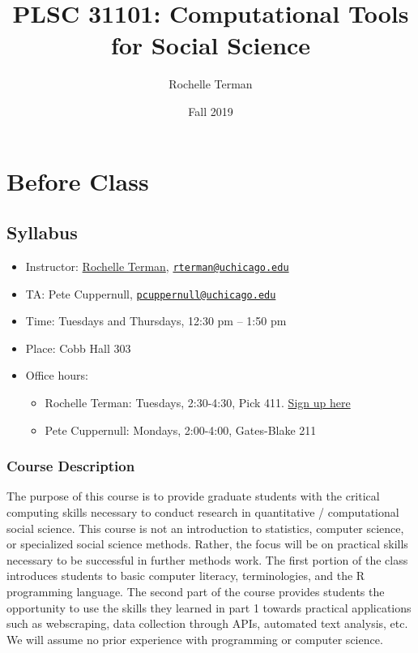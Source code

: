 \documentclass[]{book}
\title{PLSC 31101: Computational Tools for Social Science}
\author{Rochelle Terman}
\date{Fall 2019}
\providecommand{\tightlist}{%
  \setlength{\itemsep}{0pt}\setlength{\parskip}{0pt}}
\begin{document}
\maketitle

{
\setcounter{tocdepth}{1}
\tableofcontents
}
\part{Before Class}\label{part-before-class}

\chapter{Syllabus}\label{syllabus}

\begin{itemize}
\item
  Instructor: \href{http://rochelleterman.com/}{Rochelle Terman},
  \href{mailto:rterman@uchicago.edu}{\nolinkurl{rterman@uchicago.edu}}
\item
  TA: Pete Cuppernull,
  \href{mailto:pcuppernull@uchicago.edu}{\nolinkurl{pcuppernull@uchicago.edu}}
\item
  Time: Tuesdays and Thursdays, 12:30 pm -- 1:50 pm
\item
  Place: Cobb Hall 303
\item
  Office hours:

  \begin{itemize}
  \tightlist
  \item
    Rochelle Terman: Tuesdays, 2:30-4:30, Pick 411.
    \href{https://www.wejoinin.com/sheets/offrq}{Sign up here}
  \item
    Pete Cuppernull: Mondays, 2:00-4:00, Gates-Blake 211
  \end{itemize}
\end{itemize}

\section{Course Description}\label{course-description}

The purpose of this course is to provide graduate students with the
critical computing skills necessary to conduct research in quantitative
/ computational social science. This course is not an introduction to
statistics, computer science, or specialized social science methods.
Rather, the focus will be on practical skills necessary to be successful
in further methods work. The first portion of the class introduces
students to basic computer literacy, terminologies, and the R
programming language. The second part of the course provides students
the opportunity to use the skills they learned in part 1 towards
practical applications such as webscraping, data collection through
APIs, automated text analysis, etc. We will assume no prior experience
with programming or computer science.
\end{document}
